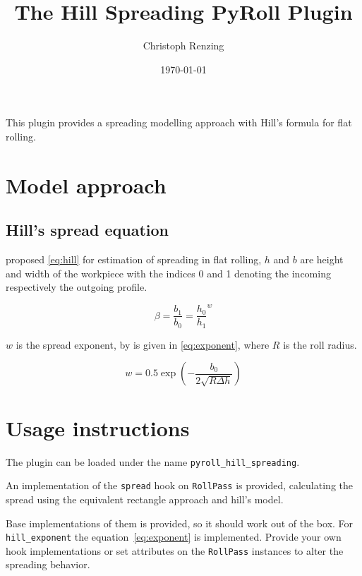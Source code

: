 \documentclass[11pt]{PyRollDocs}
\begin{document}
    \title{The Hill Spreading PyRoll Plugin}
    \author{Christoph Renzing}
    \date{\today}

    \maketitle

    This plugin provides a spreading modelling approach with Hill's formula for flat rolling.


    \section{Model approach}\label{sec:model-approach}

    \subsection{Hill's spread equation}\label{subsec:hill's-spread-equation}

    \textcite{Hill1955} proposed \autoref{eq:hill} for estimation of spreading in flat rolling,
    $h$ and $b$ are height and width of the workpiece with the indices 0 and 1 denoting the incoming respectively the outgoing profile.

    \begin{equation}
        \beta = \frac{b_1}{b_0} = \frac{h_0}{h_1} ^{w}
        \label{eq:hill}
    \end{equation}
    

    $w$ is the spread exponent, by \textcite{Hill1955} is given in \autoref{eq:exponent}, where $R$ is the roll radius.

    \begin{equation}
        w = 0.5 \exp \left( - \frac{b_0}{2 \sqrt{R \Delta h}} \right)
        \label{eq:exponent}
    \end{equation}

    \section{Usage instructions}\label{sec:usage-instructions}

    The plugin can be loaded under the name \texttt{pyroll\_hill\_spreading}.

    An implementation of the \lstinline{spread} hook on \lstinline{RollPass} is provided,
    calculating the spread using the equivalent rectangle approach and hill's model.

    Base implementations of them is provided, so it should work out of the box.
    For \lstinline{hill_exponent} the equation~\ref{eq:exponent} is implemented.
    Provide your own hook implementations or set attributes on the \lstinline{RollPass} instances to alter the spreading behavior.

    \printbibliography
\end{document}

